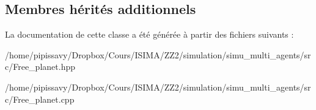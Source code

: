 \subsection*{Membres hérités additionnels}


La documentation de cette classe a été générée à partir des fichiers suivants \-:\begin{DoxyCompactItemize}
\item 
/home/pipissavy/\-Dropbox/\-Cours/\-I\-S\-I\-M\-A/\-Z\-Z2/simulation/simu\-\_\-multi\-\_\-agents/src/Free\-\_\-planet.\-hpp\item 
/home/pipissavy/\-Dropbox/\-Cours/\-I\-S\-I\-M\-A/\-Z\-Z2/simulation/simu\-\_\-multi\-\_\-agents/src/Free\-\_\-planet.\-cpp\end{DoxyCompactItemize}
